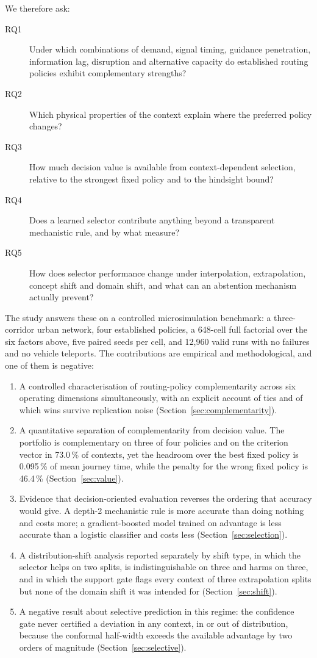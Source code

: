 \documentclass[preprint,12pt]{elsarticle}
\begin{document}
We therefore ask:

\begin{description}
\item[RQ1] Under which combinations of demand, signal timing, guidance
penetration, information lag, disruption and alternative capacity do established
routing policies exhibit complementary strengths?
\item[RQ2] Which physical properties of the context explain where the preferred
policy changes?
\item[RQ3] How much decision value is available from context-dependent
selection, relative to the strongest fixed policy and to the hindsight bound?
\item[RQ4] Does a learned selector contribute anything beyond a transparent
mechanistic rule, and by what measure?
\item[RQ5] How does selector performance change under interpolation,
extrapolation, concept shift and domain shift, and what can an abstention
mechanism actually prevent?
\end{description}

The study answers these on a controlled microsimulation benchmark: a
three-corridor urban network, four established policies, a 648-cell full
factorial over the six factors above, five paired seeds per cell, and 12{,}960
valid runs with no failures and no vehicle teleports. The contributions are
empirical and methodological, and one of them is negative:

\begin{enumerate}
\item A controlled characterisation of routing-policy complementarity across six
operating dimensions simultaneously, with an explicit account of ties and of
which wins survive replication noise (Section~\ref{sec:complementarity}).
\item A quantitative separation of complementarity from decision value. The
portfolio is complementary on three of four policies and on the criterion
vector in 73.0\,\% of contexts, yet the headroom over the best fixed policy is
0.095\,\% of mean journey time, while the penalty for the wrong fixed policy is
46.4\,\% (Section~\ref{sec:value}).
\item Evidence that decision-oriented evaluation reverses the ordering that
accuracy would give. A depth-2 mechanistic rule is more accurate than doing
nothing and costs more; a gradient-boosted model trained on advantage is less
accurate than a logistic classifier and costs less
(Section~\ref{sec:selection}).
\item A distribution-shift analysis reported separately by shift type, in which
the selector helps on two splits, is indistinguishable on three and harms on
three, and in which the support gate flags every context of three extrapolation
splits but none of the domain shift it was intended for
(Section~\ref{sec:shift}).
\item A negative result about selective prediction in this regime: the
confidence gate never certified a deviation in any context, in or out of
distribution, because the conformal half-width exceeds the available advantage
by two orders of magnitude (Section~\ref{sec:selective}).
\end{enumerate}
\end{document}
